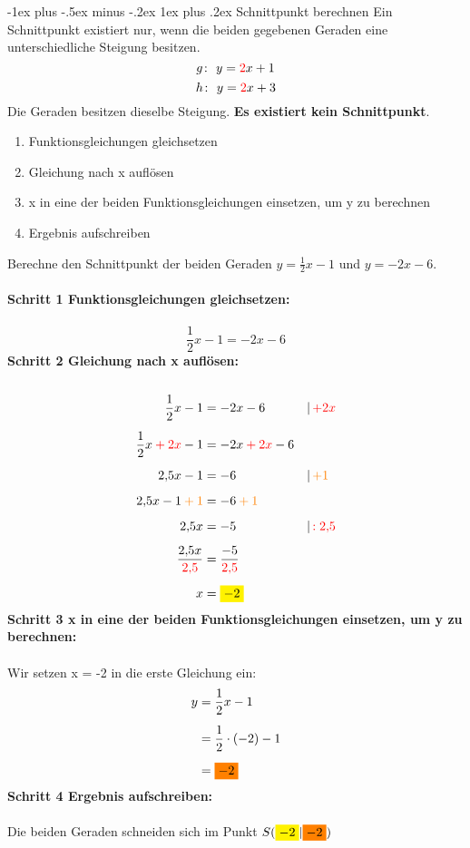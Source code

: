 \documentclass[10pt,landscape]{article}
\makeatletter
\renewcommand{\subsubsection}{\@startsection{subsubsection}{3}{0mm}%
                                {-1ex plus -.5ex minus -.2ex}%
                                {1ex plus .2ex}%
                                {\normalfont\small\bfseries}}
\makeatother
\begin{document}
\begin{multicols}{3}
    \subsubsection{Schnittpunkt berechnen}
    Ein Schnittpunkt existiert nur, wenn die beiden gegebenen Geraden eine unterschiedliche Steigung besitzen.
    \[g\colon~y = {\color{red}2}x + 1\]
    \[h\colon~y = {\color{red}2}x + 3\]
    Die Geraden besitzen dieselbe Steigung. \textbf{Es existiert kein Schnittpunkt}.
    \begin{enumerate}
        \item Funktionsgleichungen gleichsetzen
        \item Gleichung nach x auflösen
        \item x in eine der beiden Funktionsgleichungen einsetzen, um y zu berechnen
        \item Ergebnis aufschreiben
    \end{enumerate}
    Berechne den Schnittpunkt der beiden Geraden $y = \frac{1}{2}x - 1$ und $y = -2x - 6$.\\~\\
    \textbf{Schritt 1 Funktionsgleichungen gleichsetzen:}\\~\\
    \[\frac{1}{2}x - 1 = -2x - 6\]
    \textbf{Schritt 2 Gleichung nach x auflösen:}\\~\\
    \begin{align*} \frac{1}{2}x - 1 &= -2x - 6 &&|\, {\color{red}+2x} \\[5px] \frac{1}{2}x {\color{red}\: + \: 2x} - 1 &= -2x {\color{red}\: + \: 2x} - 6 \\[5px] 2{,}5x - 1 &= - 6 &&|\, {\color{orange}+1} \\[5px] 2{,}5x - 1 {\color{orange}\: + \: 1} &= - 6 {\color{orange}\: + \: 1} \\[5px] 2{,}5x &= -5 &&|\, {\color{red}:2{,}5} \\[5px] \frac{2{,}5x}{{\color{red}2{,}5}} &= \frac{-5}{{\color{red}2{,}5}} \\[5px] x &= {\colorbox{yellow}{$-2$}} \end{align*}
    \textbf{Schritt 3 x in eine der beiden Funktionsgleichungen einsetzen, um y zu berechnen:}\\~\\
    Wir setzen x = -2 in die erste Gleichung ein:
    \begin{align*} y &= \frac{1}{2}x - 1 \\[5px] &= \frac{1}{2} \cdot (-2) - 1 \\[5px] &= {\colorbox{orange}{$-2$}} \end{align*}
    \textbf{Schritt 4 Ergebnis aufschreiben:}\\~\\
    Die beiden Geraden schneiden sich im Punkt $S({\colorbox{yellow}{$-2$}}|{\colorbox{orange}{$-2$}})$

\end{multicols}
\end{document}
